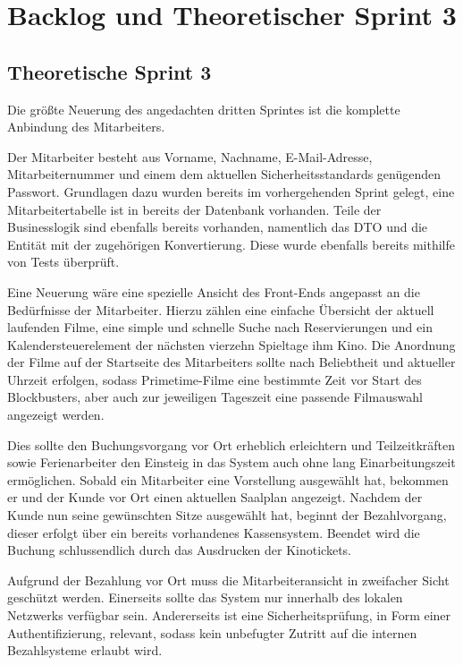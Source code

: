 \section{Backlog und Theoretischer Sprint 3}

\subsection{Theoretische Sprint 3}
Die größte Neuerung des angedachten dritten Sprintes ist die komplette Anbindung des Mitarbeiters. 

Der Mitarbeiter besteht aus Vorname, Nachname, E-Mail-Adresse, Mitarbeiternummer und einem dem aktuellen Sicherheitsstandards genügenden Passwort.
Grundlagen dazu wurden bereits im vorhergehenden Sprint gelegt, eine Mitarbeitertabelle ist in bereits der Datenbank vorhanden.
Teile der Businesslogik sind ebenfalls bereits vorhanden, namentlich das \acs{DTO} und die Entität mit der zugehörigen Konvertierung.
Diese wurde ebenfalls bereits mithilfe von Tests überprüft.

Eine Neuerung wäre eine spezielle Ansicht des Front-Ends angepasst an die Bedürfnisse der Mitarbeiter. 
Hierzu zählen eine einfache Übersicht der aktuell laufenden Filme, eine simple und schnelle Suche nach Reservierungen und ein Kalendersteuerelement der nächsten vierzehn Spieltage ihm Kino.
Die Anordnung der Filme auf der Startseite des Mitarbeiters sollte nach Beliebtheit und aktueller Uhrzeit erfolgen, sodass Primetime-Filme eine bestimmte Zeit vor Start des Blockbusters, aber auch zur jeweiligen Tageszeit eine passende Filmauswahl angezeigt werden.

Dies sollte den Buchungsvorgang vor Ort erheblich erleichtern und Teilzeitkräften sowie Ferienarbeiter den Einsteig in das System auch ohne lang Einarbeitungszeit ermöglichen.
Sobald ein Mitarbeiter eine Vorstellung ausgewählt hat, bekommen er und der Kunde vor Ort einen aktuellen Saalplan angezeigt.
Nachdem der Kunde nun seine gewünschten Sitze ausgewählt hat, beginnt der Bezahlvorgang, dieser erfolgt über ein bereits vorhandenes Kassensystem. Beendet wird die Buchung schlussendlich durch das Ausdrucken der Kinotickets.

Aufgrund der Bezahlung vor Ort muss die Mitarbeiteransicht in zweifacher Sicht geschützt werden.
Einerseits sollte das System nur innerhalb des lokalen Netzwerks verfügbar sein.
Andererseits ist eine Sicherheitsprüfung, in Form einer Authentifizierung, relevant, sodass kein unbefugter Zutritt auf die internen Bezahlsysteme erlaubt wird.

